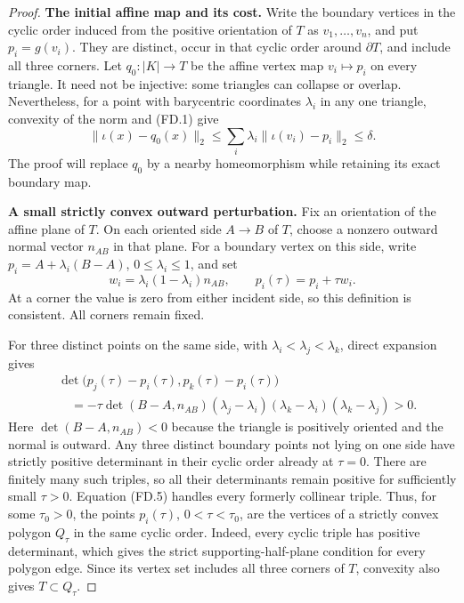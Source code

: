 \begin{proof}
\textbf{The initial affine map and its cost.}\quad
Write the boundary vertices in the cyclic order induced from the
positive orientation of $T$ as $v_1,\ldots,v_n$, and put $p_i=g(v_i)$.
They are distinct, occur in that cyclic order around $\partial T$,
and include all three corners. Let $q_0:|K|\to T$ be the affine
vertex map $v_i\mapsto p_i$ on every triangle. It need not be
injective: some triangles can collapse or overlap. Nevertheless,
for a point with barycentric coordinates $\lambda_i$ in any one
triangle, convexity of the norm and (FD.1) give
\[
 \|\iota(x)-q_0(x)\|_2
 \le\sum_i\lambda_i\|\iota(v_i)-p_i\|_2\le\delta.
 \tag{FD.3}
\]
The proof will replace $q_0$ by a nearby homeomorphism while retaining
its exact boundary map.

\textbf{A small strictly convex outward perturbation.}\quad
Fix an orientation of the affine plane of $T$. On each oriented side
$A\to B$ of $T$, choose a nonzero outward normal vector $n_{AB}$
in that plane. For a boundary vertex on this side, write
$p_i=A+\lambda_i(B-A)$, $0\le\lambda_i\le1$, and set
\[
 w_i=\lambda_i(1-\lambda_i)n_{AB},\qquad
 p_i(\tau)=p_i+\tau w_i.
 \tag{FD.4}
\]
At a corner the value is zero from either incident side, so this
definition is consistent. All corners remain fixed.

For three distinct points on the same side, with
$\lambda_i<\lambda_j<\lambda_k$, direct expansion gives
\[
 \begin{split}
 &\det\bigl(p_j(\tau)-p_i(\tau),p_k(\tau)-p_i(\tau)\bigr)\\
 &\quad=-\tau\det(B-A,n_{AB})
 (\lambda_j-\lambda_i)(\lambda_k-\lambda_i)(\lambda_k-\lambda_j)>0.
 \end{split}
 \tag{FD.5}
\]
Here $\det(B-A,n_{AB})<0$ because the triangle is positively oriented
and the normal is outward. Any three distinct boundary points not
lying on one side have strictly positive determinant in their cyclic
order already at $\tau=0$. There are finitely many such triples,
so all their determinants remain positive for sufficiently small
$\tau>0$. Equation (FD.5) handles every formerly collinear triple.
Thus, for some $\tau_0>0$, the points $p_i(\tau)$, $0<\tau<\tau_0$,
are the vertices of a strictly convex polygon $Q_\tau$ in the same
cyclic order. Indeed, every cyclic triple has positive determinant,
which gives the strict supporting-half-plane condition for every
polygon edge. Since its vertex set includes all three corners of
$T$, convexity also gives $T\subset Q_\tau$.


\end{proof}
